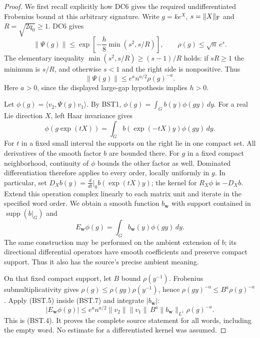 \documentclass[11pt,a4paper]{article}
\numberwithin{equation}{section}
\theoremstyle{remark}\newtheorem{remark}[theorem]{Remark}
\begin{document}
\begin{proof}
We first recall explicitly how DC6 gives the required undifferentiated
Frobenius bound at this arbitrary signature.  Write $g=ke^X$,
$s=\|X\|_{\rm F}$ and $R=\sqrt{2q_0}\ge1$.  DC6 gives
\[
 \|\Psi(g)\|\le
  \exp\left[-\frac h8\min(s^2,s/R)\right],
 \qquad \rho(g)\le\sqrt n\,e^s.
\]
The elementary inequality
$\min(s^2,s/R)\ge(s-1)/R$ holds: if $sR\ge1$ the minimum
is $s/R$, and otherwise $s<1$ and the right side is nonpositive.
Thus
\[
           \|\Psi(g)\|\le e^a n^{a/2}\rho(g)^{-a}.
 \tag{BST.5}
\]
Here $a>0$, since the displayed large-gap hypothesis implies $h>0$.

Let $\phi(g)=\langle v_2,\Psi(g)v_1\rangle$.
By BST1, $\phi(g)=\int_G b(y)\phi(gy)\,dy$.
For a real Lie direction $X$, left Haar invariance gives
\[
 \phi(g\exp(tX))
    =\int_G b(\exp(-tX)y)\phi(gy)\,dy.
 \tag{BST.6}
\]
For $t$ in a fixed small interval the supports on the right lie in
one compact set.  All derivatives of the smooth factor $b$ are
bounded there.  For $g$ in a fixed compact neighborhood, continuity
of $\phi$ bounds the other factor as well.  Dominated differentiation
therefore applies to every order, locally uniformly in $g$.
In particular, set
$D_Xb(y)=\frac{d}{dt}|_{0}b(\exp(tX)y)$; the kernel for $R_X\phi$
is $-D_Xb$.  Extend this operation complex linearly to each
matrix unit and iterate in the specified word order.  We obtain a
smooth function $b_{\mathbf w}$ with support contained in
$\operatorname{supp}(b|_G)$ and
\[
 E_{\mathbf w}\phi(g)=
           \int_G b_{\mathbf w}(y)\phi(gy)\,dy .
 \tag{BST.7}
\]
The same construction may be performed on the ambient extension of
$b$; its directional differential operators have smooth coefficients
and preserve compact support.  Thus it also has the source's precise
ambient meaning.

On that fixed compact support, let $B$ bound $\rho(y^{-1})$.
Frobenius submultiplicativity gives
$\rho(g)\le\rho(gy)\rho(y^{-1})$, hence
$\rho(gy)^{-a}\le B^a\rho(g)^{-a}$.
Apply (BST.5) inside (BST.7) and integrate
$|b_{\mathbf w}|$:
\[
 |E_{\mathbf w}\phi(g)|
 \le e^a n^{a/2}\|v_2\|\|v_1\|\,
       B^a\|b_{\mathbf w}\|_{L^1}\rho(g)^{-a}.
\]
This is (BST.4).  It proves the complete source statement for all
words, including the empty word.  No estimate for a differentiated
kernel was assumed.
\end{proof}

\end{document}
